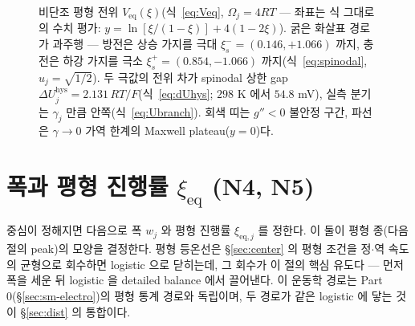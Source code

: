\documentclass[11pt,a4paper]{article}
\newcommand{\eq}{\mathrm{eq}}
\newcommand{\hys}{\mathrm{hys}}
\begin{document}
\begin{figure}[t]
\caption{비단조 평형 전위 $V_\eq(\xi)$(식~\eqref{eq:Veq}, $\Omega_j=4RT$ --- 좌표는 식 그대로의 수치 평가:
$y=\ln[\xi/(1-\xi)]+4(1-2\xi)$). 굵은 화살표 경로가 과주행 --- 방전은 상승 가지를 극대 $\xi_s^-{=}(0.146,{+}1.066)$
까지, 충전은 하강 가지를 극소 $\xi_s^+{=}(0.854,{-}1.066)$ 까지(식~\eqref{eq:spinodal}, $u_j{=}\sqrt{1/2}$). 두 극값의
전위 차가 spinodal 상한 gap $\Delta U_j^\hys=2.131\,RT/F$(식~\eqref{eq:dUhys}; $298$ K 에서 $54.8$ mV), 실측 분기는
$\gamma_j$ 만큼 안쪽(식~\eqref{eq:Ubranch}). 회색 띠는 $g''<0$ 불안정 구간, 파선은 $\gamma\!\to\!0$ 가역 한계의 Maxwell
plateau($y{=}0$)다.}
\label{fig:hysloop}
\end{figure}

\section{폭과 평형 진행률 $\xi_\eq$ (N4, N5)}\label{sec:width}
중심이 정해지면 다음으로 폭 $w_j$ 와 평형 진행률 $\xi_{\eq,j}$ 를 정한다. 이 둘이 평형 종(다음 절의 peak)의 모양을
결정한다. 평형 등온선은 \S\ref{sec:center} 의 평형 조건을 정$\cdot$역 속도의 균형으로 회수하면 logistic 으로 닫히는데,
그 회수가 이 절의 핵심 유도다 — 먼저 폭을 세운 뒤 logistic 을 detailed balance 에서 끌어낸다. 이 운동학 경로는 Part 0(\S\ref{sec:sm-electro})의 평형 통계
경로와 독립이며, 두 경로가 같은 logistic 에 닿는 것이 \S\ref{sec:dist} 의 통합이다.
\end{document}
